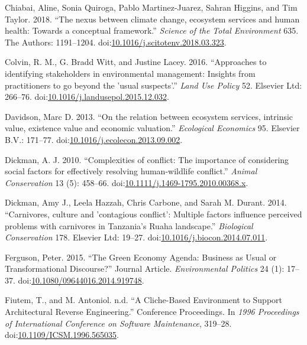 \documentclass[fleqn,10pt]{wlpeerj} %
\begin{document}
\hypertarget{ref-Chiabai2018}{}
Chiabai, Aline, Sonia Quiroga, Pablo Martinez-Juarez, Sahran Higgins,
and Tim Taylor. 2018. ``The nexus between climate change, ecosystem
services and human health: Towards a conceptual framework.''
\emph{Science of the Total Environment} 635. The Authors: 1191--1204.
doi:\href{https://doi.org/10.1016/j.scitotenv.2018.03.323}{10.1016/j.scitotenv.2018.03.323}.

\hypertarget{ref-Colvin2016}{}
Colvin, R. M., G. Bradd Witt, and Justine Lacey. 2016. ``Approaches to
identifying stakeholders in environmental management: Insights from
practitioners to go beyond the 'usual suspects'.'' \emph{Land Use
Policy} 52. Elsevier Ltd: 266--76.
doi:\href{https://doi.org/10.1016/j.landusepol.2015.12.032}{10.1016/j.landusepol.2015.12.032}.

\hypertarget{ref-Davidson2013}{}
Davidson, Marc D. 2013. ``On the relation between ecosystem services,
intrinsic value, existence value and economic valuation.''
\emph{Ecological Economics} 95. Elsevier B.V.: 171--77.
doi:\href{https://doi.org/10.1016/j.ecolecon.2013.09.002}{10.1016/j.ecolecon.2013.09.002}.

\hypertarget{ref-Dickman2010}{}
Dickman, A. J. 2010. ``Complexities of conflict: The importance of
considering social factors for effectively resolving human-wildlife
conflict.'' \emph{Animal Conservation} 13 (5): 458--66.
doi:\href{https://doi.org/10.1111/j.1469-1795.2010.00368.x}{10.1111/j.1469-1795.2010.00368.x}.

\hypertarget{ref-Dickman2014}{}
Dickman, Amy J., Leela Hazzah, Chris Carbone, and Sarah M. Durant. 2014.
``Carnivores, culture and 'contagious conflict': Multiple factors
influence perceived problems with carnivores in Tanzania's Ruaha
landscape.'' \emph{Biological Conservation} 178. Elsevier Ltd: 19--27.
doi:\href{https://doi.org/10.1016/j.biocon.2014.07.011}{10.1016/j.biocon.2014.07.011}.

\hypertarget{ref-Ferguson2015}{}
Ferguson, Peter. 2015. ``The Green Economy Agenda: Business as Usual or
Transformational Discourse?'' Journal Article. \emph{Environmental
Politics} 24 (1): 17--37.
doi:\href{https://doi.org/10.1080/09644016.2014.919748}{10.1080/09644016.2014.919748}.

\hypertarget{ref-Fiutem1996}{}
Fiutem, T., and M. Antoniol. n.d. ``A Cliche-Based Environment to
Support Architectural Reverse Engineering.'' Conference Proceedings. In
\emph{1996 Proceedings of International Conference on Software
Maintenance}, 319--28.
doi:\href{https://doi.org/10.1109/ICSM.1996.565035}{10.1109/ICSM.1996.565035}.
\end{document}
